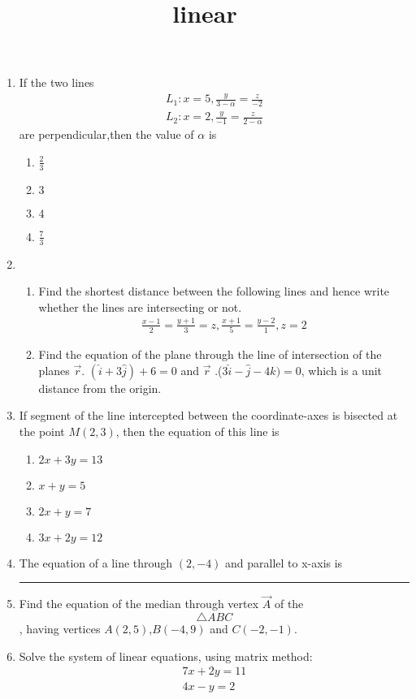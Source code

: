\documentclass{article}
\title{linear}
\begin{document}
\begin{enumerate}
	\item If the two lines
	\begin{align}	
		L_{1} : x=5, \frac{y}{3-\alpha} = \frac{z}{-2}
		\\L_{2}: x=2, \frac{y}{-1} = \frac{z}{2-\alpha}
	\end{align}
   	 are perpendicular,then the value of $\alpha$ is
   	\begin{enumerate}%
   		\item $\frac{2}{3}$
		\item $3$
		\item $4$
		\item $\frac{7}{3}$
	\end{enumerate}
	\item \begin{enumerate} %
	\item Find the shortest distance between the following lines and hence write whether the lines are intersecting or not.
	\begin{align}
		\frac{x-1}{2} = \frac{y+1}{3}=z,
		\frac{x+1}{5} = \frac{y-2}{1}, 
		z=2
	\end{align}
	\item Find the equation of the plane through the line of intersection of the planes $\vec{r}$. $(\hat{i}+3\hat{j}) + 6 = 0$ and $\vec{r}$ .($3\hat{i}-\hat{j}-4\hat{k}) = 0$, which is a unit distance from the origin.
	\end{enumerate}
\item If segment of the line intercepted between the coordinate-axes is bisected at the point $M(2,3)$, then the equation of this line is
		\begin{enumerate}%
			\item $2x + 3y = 13$
			\item $x+y = 5$
			\item $2x + y = 7$
			\item $3x + 2y = 12$
		\end{enumerate}
	\item The equation of a line through $(2,-4)$ and parallel to x-axis is\rule{1cm}{0.15mm}
	\item Find the equation of the median through vertex $\vec{A}$ of the $$\triangle{ABC}$$, having vertices $A(2,5)$,$B(-4,9)$ and $C(-2,-1)$.
	\item Solve the system of linear equations, using matrix method:
		\begin{align}	
			7x+2y = 11
			\\4x-y = 2
		\end{align}
\end{enumerate}
\end{document}
